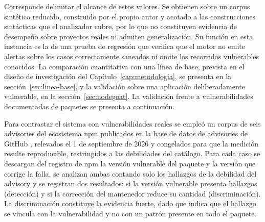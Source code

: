 Corresponde delimitar el alcance de estos valores. Se obtienen sobre un corpus sintético reducido, construido por el propio autor y acotado a las construcciones sintácticas que el analizador cubre, por lo que no constituyen evidencia de desempeño sobre proyectos reales ni admiten generalización. Su función en esta instancia es la de una prueba de regresión que verifica que el motor no emite alertas sobre los casos correctamente saneados ni omite los recorridos vulnerables conocidos. La comparación cuantitativa con una línea de base, prevista en el diseño de investigación del Capítulo~\ref{cap:metodologia}, se presenta en la sección~\ref{sec:linea-base}, y la validación sobre una aplicación deliberadamente vulnerable, en la sección~\ref{sec:nodegoat}. La validación frente a vulnerabilidades documentadas de paquetes se presenta a continuación.

Para contrastar el sistema con vulnerabilidades reales se empleó un corpus de seis advisories del ecosistema npm publicados en la base de datos de advisories de GitHub \citep{ghadvisory}, relevados el 1 de septiembre de 2026 y congelados para que la medición resulte reproducible, restringidos a las debilidades del catálogo. Para cada caso se descargan del registro de npm la versión vulnerable del paquete y la versión que corrige la falla, se analizan ambas contando solo los hallazgos de la debilidad del advisory y se registran dos resultados: si la versión vulnerable presenta hallazgos (detección) y si la corrección del mantenedor reduce su cantidad (discriminación). La discriminación constituye la evidencia fuerte, dado que indica que el hallazgo se vincula con la vulnerabilidad y no con un patrón presente en todo el paquete.

